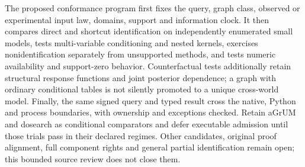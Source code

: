 The proposed conformance program first fixes the query, graph class, observed
or experimental input law, domains, support and information clock. It then
compares direct and shortcut identification on independently enumerated small
models, tests multi-variable conditioning and nested kernels, exercises
nonidentification separately from unsupported methods, and tests numeric
availability and support-zero behavior. Counterfactual tests additionally
retain structural response functions and joint posterior dependence; a graph
with ordinary conditional tables is not silently promoted to a unique
cross-world model. Finally, the same signed query and typed result cross the
native, Python and process boundaries, with ownership and exceptions checked.
Retain aGrUM and dosearch as conditional comparators and defer executable
admission until those trials pass in their declared regimes. Other candidates,
original proof alignment, full component rights and general partial
identification remain open; this bounded source review does not close them.
\citep{exec19_cxx_identification_source,exec18_rid_dosearch,exec19_cxx_identification_reference}

